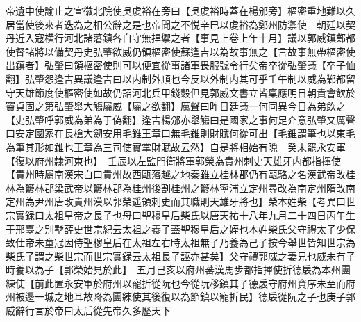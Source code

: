 帝遺中使諭止之宣徽北院使吳䖍裕在旁曰【吳䖍裕時蓋在楊邠旁】樞密重地難以久居當使後來者迭為之相公辭之是也帝聞之不悦辛巳以䖍裕為鄭州防禦使　朝廷以契丹近入寇横行河北諸藩鎮各自守無捍禦之者【事見上卷上年十月】議以郭威鎮鄴都使督諸將以備契丹史弘肇欲威仍領樞密使蘇逢吉以為故事無之【言故事無帶樞密使出鎮者】弘肇曰領樞密使則可以便宜從事諸軍畏服號令行矣帝卒從弘肇議【卒子恤翻】弘肇怨逢吉異議逢吉曰以内制外順也今反以外制内其可乎壬午制以威為鄴都留守天雄節度使樞密使如故仍詔河北兵甲錢糓但見郭威文書立皆稟應明日朝貴會飲於竇貞固之第弘肇舉大觴屬威【屬之欲翻】厲聲曰昨日廷議一何同異今日為弟飲之【史弘肇呼郭威為弟為于偽翻】逢吉楊邠亦舉觴曰是國家之事何足介意弘肇又厲聲曰安定國家在長槍大劒安用毛錐王章曰無毛錐則財賦何從可出【毛錐謂筆也以東毛為筆其形如錐也王章為三司使實掌財賦故云然】自是將相始有隙　癸未罷永安軍【復以府州隸河東也】　壬辰以左監門衛將軍郭榮為貴州刺史天雄牙内都指揮使【貴州時屬南漢宋白曰貴州故西甌落越之地秦雖立桂林郡仍有甌駱之名漢武帝改桂林為鬰林郡梁武帝以鬰林郡為桂州後割桂州之鬰林寧浦立定州尋改為南定州隋改南定州為尹州唐改貴州漢以郭榮遥領刺史而其職則天雄牙將也】榮本姓柴【考異曰世宗實録曰太祖皇帝之長子也母曰聖穆皇后柴氏以唐天祐十八年九月二十四日丙午生于邢臺之别墅薛史世宗紀云太祖之養子蓋聖穆皇后之姪也本姓柴氏父守禮太子少保致仕帝未童冠因侍聖穆皇后在太祖左右時太祖無子乃養為己子按今舉世皆知世宗為柴氏子謂之柴世宗而世宗實録云太祖長子誣亦甚矣】父守禮郭威之妻兄也威未有子時養以為子【郭榮始見於此】　五月己亥以府州蕃漢馬步都指揮使折德扆為本州團練使【前此置永安軍於府州以寵折從阮也今從阮移鎮其子德扆守府州資序未至而府州被邊一城之地耳故降為團練使其後復以為節鎮以寵折民】德扆從阮之子也庚子郭威辭行言於帝曰太后從先帝久多歷天下

